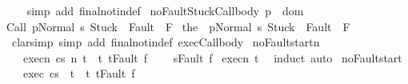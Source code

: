 \begin{isabellebody}
%
\isadelimproof
\ \ %
\endisadelimproof
%
\isatagproof
{}\isamarkupfalse%
\ {\isacharparenleft}simp\ add{\isacharcolon}\ final{\isacharunderscore}notin{\isacharunderscore}def{\isacharparenright}%
\endisatagproof
{\isafoldproof}%
%
\isadelimproof
\isanewline
%
\endisadelimproof
\isanewline
{}\isamarkupfalse%
\ noFaultStuck{\isacharunderscore}Call{\isacharunderscore}body{\isacharprime}{\isacharcolon}\ {\isachardoublequoteopen}p\ {\isasymin}\ dom\ {\isasymGamma}\ {\isasymLongrightarrow}\isanewline
{\isasymGamma}{\isasymturnstile}{\isasymlangle}Call\ p{\isacharcomma}Normal\ s{\isasymrangle}\ {\isasymRightarrow}{\isasymnotin}{\isacharparenleft}{\isacharbraceleft}Stuck{\isacharbraceright}\ {\isasymunion}\ Fault\ {\isacharbackquote}\ {\isacharparenleft}{\isacharminus}F{\isacharparenright}{\isacharparenright}\ {\isacharequal}\isanewline
{\isasymGamma}{\isasymturnstile}{\isasymlangle}the\ {\isacharparenleft}{\isasymGamma}\ p{\isacharparenright}{\isacharcomma}Normal\ s{\isasymrangle}\ {\isasymRightarrow}{\isasymnotin}{\isacharparenleft}{\isacharbraceleft}Stuck{\isacharbraceright}\ {\isasymunion}\ Fault\ {\isacharbackquote}\ {\isacharparenleft}{\isacharminus}F{\isacharparenright}{\isacharparenright}{\isachardoublequoteclose}\isanewline
%
\isadelimproof
\ \ %
\endisadelimproof
%
\isatagproof
{}\isamarkupfalse%
\ {\isacharparenleft}clarsimp\ simp\ add{\isacharcolon}\ final{\isacharunderscore}notin{\isacharunderscore}def\ exec{\isacharunderscore}Call{\isacharunderscore}body{\isacharparenright}%
\endisatagproof
{\isafoldproof}%
%
\isadelimproof
\isanewline
%
\endisadelimproof
\isanewline
{}\isamarkupfalse%
\ noFault{\isacharunderscore}startn{\isacharcolon}\ \isanewline
\ \ \ execn{\isacharcolon}\ {\isachardoublequoteopen}{\isasymGamma}{\isasymturnstile}{\isasymlangle}c{\isacharcomma}s{\isasymrangle}\ {\isacharequal}n{\isasymRightarrow}\ t{\isachardoublequoteclose}\ \ t{\isacharcolon}\ {\isachardoublequoteopen}t{\isasymnoteq}Fault\ f{\isachardoublequoteclose}\ \isanewline
\ \ \ {\isachardoublequoteopen}s{\isasymnoteq}Fault\ f{\isachardoublequoteclose}\isanewline
%
\isadelimproof
%
\endisadelimproof
%
\isatagproof
{}\isamarkupfalse%
\ execn\ t\ \isamarkupfalse%
\ {\isacharparenleft}induct{\isacharparenright}\ auto%
\endisatagproof
{\isafoldproof}%
%
\isadelimproof
\isanewline
%
\endisadelimproof
\isanewline
{}\isamarkupfalse%
\ noFault{\isacharunderscore}start{\isacharcolon}\ \isanewline
\ \ \ exec{\isacharcolon}\ {\isachardoublequoteopen}{\isasymGamma}{\isasymturnstile}{\isasymlangle}c{\isacharcomma}s{\isasymrangle}\ {\isasymRightarrow}\ t{\isachardoublequoteclose}\ \ t{\isacharcolon}\ {\isachardoublequoteopen}t{\isasymnoteq}Fault\ f{\isachardoublequoteclose}\ \isanewline

\end{isabellebody}
